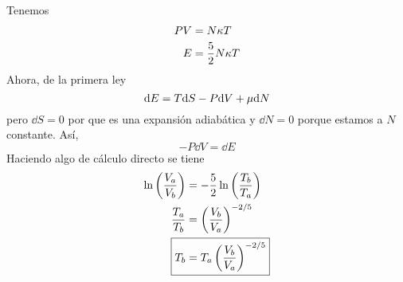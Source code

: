 \begin{sol}
	Tenemos 
	\begin{align}
  PV&=N\kappa T\\
  E&=\frac{5}{2}N\kappa T
\end{align}
Ahora, de la primera ley
\begin{equation}
  \dd E=T\dd S-P\dd V+\mu \dd N
\end{equation}
pero $\dd S=0$ por que es una expansión adiabática y $\dd N=0$ porque estamos a $N$ constante. Así,
\begin{equation}
  -P\dd V=\dd E
\end{equation}
Haciendo algo de cálculo directo se tiene
\begin{align}
  \ln\left(\frac{V_a}{V_b}\right)&=-\frac{5}{2}\ln\left(\frac{T_b}{T_a}\right)\\
  \frac{T_a}{T_b}&=\left(\frac{V_b}{V_a}\right)^{-2/5}\\
  \Aboxed{T_b&=T_a\left(\frac{V_b}{V_a}\right)^{-2/5}}
\end{align}




\end{sol}












